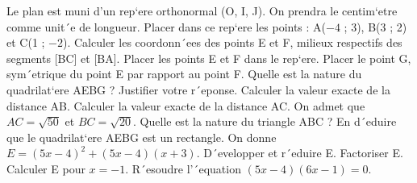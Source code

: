 \documentclass{fiche}
\begin{document}
\exe Le plan est muni d’un rep`ere orthonormal (O, I, J). On prendra le
centim`etre comme unit´e de longueur.
\que Placer dans ce rep`ere les points : A($-4$ ; 3), B(3 ; 2) et C(1 ; $-2$).
\que Calculer les coordonn´ees des points E et F, milieux respectifs des
segments [BC] et [BA]. Placer les points E et F dans le rep`ere.
\que Placer le point G, sym´etrique du point E par rapport au point F.
\que Quelle est la nature du quadrilat`ere AEBG ? Justifier votre r´eponse.
\qsq Calculer la valeur exacte de la distance AB.
\qsq Calculer la valeur exacte de la distance AC.
\squ On admet que $AC=\sqrt{50}$ et $BC=\sqrt{20}$. Quelle est la nature
du triangle ABC ?
\squ En d´eduire que le quadrilat`ere AEBG est un rectangle.
\exe On donne $E=(5x-4)^2+(5x-4)(x+3)$.
\que D´evelopper et r´eduire E.
\que Factoriser E.
\que Calculer E pour $x=-1$.
\que R´esoudre l’´equation $(5x-4)(6x-1)=0$.
\end{document}
